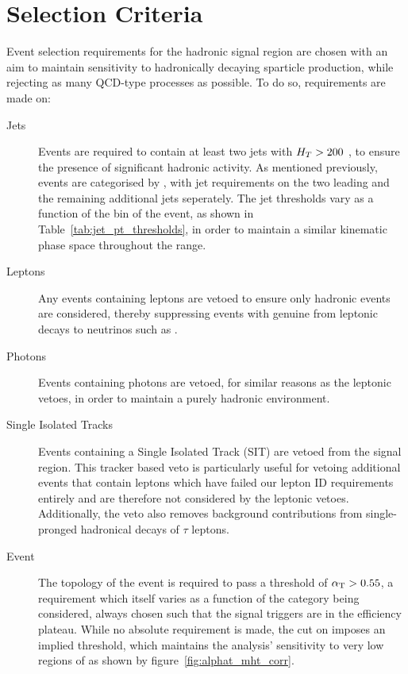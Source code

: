 \section{Selection Criteria}
\label{sec:selec_crit}

Event selection requirements for the hadronic signal region are chosen with an
aim to
maintain sensitivity to hadronically decaying sparticle production, while 
rejecting as many QCD-type processes as possible. To do so, requirements are 
made on:

\begin{description}
\item[Jets]
Events are required to contain at least two jets with
$H_T > 200$ \gev, to ensure the presence of significant hadronic activity. As 
mentioned previously, events are categorised by \HT, with jet \Pt
requirements on the two leading and the remaining additional jets seperately.
The jet \Pt thresholds vary as a function of the \HT bin of the event, as shown in
Table~\ref{tab:jet_pt_thresholds}, in order to maintain a similar kinematic
phase space throughout the \HT range.

\item[Leptons]
Any events containing leptons are vetoed to ensure only hadronic events
are considered, thereby suppressing events with genuine \met from leptonic decays to
neutrinos such as \wlnu.

\item[Photons]
Events containing photons are vetoed, for similar reasons as the leptonic 
vetoes, in order to maintain a purely hadronic environment.

\item[Single Isolated Tracks]
Events containing a Single Isolated Track (SIT) are vetoed from the signal 
region. This tracker based veto is particularly useful for vetoing additional events 
that contain leptons which have failed our lepton ID requirements entirely and 
are therefore not considered by the leptonic vetoes. Additionally, the veto also
removes background contributions from single-pronged hadronical decays of $\tau$
leptons.

\item[Event]
The topology of the event is required to pass a threshold of $\alpha_{\text{T}} > 0.55$, 
a requirement which itself varies as a function of the \HT category being
considered, always
chosen such that the signal triggers are in the efficiency plateau. While no
absolute \met requirement is made, the cut on
\alphat imposes an implied threshold, which maintains the analysis'
sensitivity to very low regions of \met as shown by figure~\ref{fig:alphat_mht_corr}.

\end{description}

